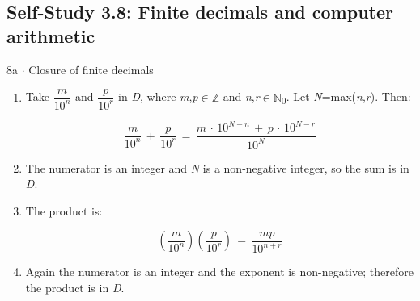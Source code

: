 \documentclass[11pt]{article}
\begin{document}
\begin{keepsection}\subsection{Self-Study 3.8: Finite decimals and computer arithmetic}

\begin{workedbox}{8a \ensuremath{\cdot} Closure of finite decimals}
\begin{enumerate}
\item {}
Take {\small\ensuremath{\dfrac{{m}}{10^{{n}}}}} and {\small\ensuremath{\dfrac{{p}}{10^{{r}}}}} in \textit{D}, where \textit{m},\textit{p}\ensuremath{\in}\ensuremath{\mathbb{Z}} and \textit{n},\textit{r}\ensuremath{\in}\ensuremath{\mathbb{N}}\textsubscript{0}. Let \textit{N}=max(\textit{n},\textit{r}). Then:

\begin{equation*}\dfrac{{m}}{10^{{n}}}\, +\, \dfrac{{p}}{10^{{r}}}\, =\, \dfrac{{m}\, \cdot \, 10^{{N}-{n}}\, +\, {p}\, \cdot \, 10^{{N}-{r}}}{10^{{N}}}\end{equation*}
\item The numerator is an integer and \textit{N} is a non-negative integer, so the sum is in \textit{D}.
\item {}
The product is:

\begin{equation*}\left(\dfrac{{m}}{10^{{n}}}\right)\left(\dfrac{{p}}{10^{{r}}}\right)\, =\, \dfrac{{m}{p}}{10^{{n}+{r}}}\end{equation*}
\item Again the numerator is an integer and the exponent is non-negative; therefore the product is in \textit{D}.
\end{enumerate}
\end{workedbox}

\end{keepsection}
\end{document}
